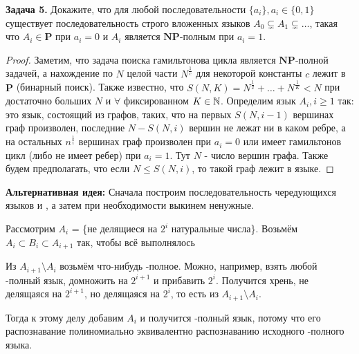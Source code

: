 \textbf{Задача 5.}
Докажите, что для любой последовательности $\{a_i\}, a_i \in \{0, 1\}$ существует последовательность строго вложенных языков $A_0 \subsetneq A_1 \subsetneq \dots$, такая что $A_i \in \mathbf{P}$ при $a_i = 0$ и $A_i$ является $\mathbf{NP}$-полным при $a_i = 1$.

\begin{proof}
Заметим, что задача поиска гамильтонова цикла является $\mathbf{NP}$-полной задачей, а нахождение по $N$ целой части $N^{\frac{1}{c}}$ для некоторой константы $c$ лежит в $\mathbf{P}$ (бинарный поиск). Также известно, что $S(N, K) = N^{\frac{1}{2}} + \dots + N^{\frac{1}{K}} < N$ при достаточно больших $N$ и $\forall$ фиксированном $K \in \mathbb{N}$. Определим язык $A_i, i \ge 1$ так: это язык, состоящий из графов, таких, что на первых $S(N, i - 1)$ вершинах граф произволен, последние $N - S(N, i)$ вершин не лежат ни в каком ребре, а на остальных $n^{\frac{1}{i}}$ вершинах граф произволен при $a_i = 0$ или имеет гамильтонов цикл (либо не имеет ребер) при $a_i = 1$. Тут $N$ - число вершин графа. Также будем предполагать, что если $N \leq S(N, i)$, то такой граф лежит в языке.
\end{proof}

\textbf{Альтернативная идея:} Сначала построим последовательность чередующихся языков \p и \npc, а затем при необходимости выкинем ненужные. 

Рассмотрим $A_i$ = \{не делящиеся на $2^i$ натуральные числа\}. Возьмём $A_i \subset B_i \subset A_{i+1}$ так, чтобы всё выполнялось

Из $A_{i+1} \setminus A_i$ возьмём что-нибудь \np-полное. Можно, например, взять любой \np-полный язык, домножить на $2^{i+1}$ и прибавить $2^i$. Получится хрень, не делящаяся на $2^{i+1}$, но делящаяся на $2^{i}$, то есть из $A_{i+1} \setminus A_i$.

Тогда к этому делу добавим $A_i$ и получится \np-полный язык, потому что его распознавание полиномиально эквивалентно распознаванию исходного \np-полного языка.